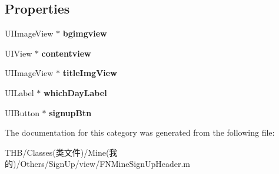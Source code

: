 \subsection*{Properties}
\begin{DoxyCompactItemize}
\item 
\mbox{\label{category_f_n_mine_sign_up_header_07_08_ac47719f30dbc6fb092c7ae9d204ffabe}} 
U\+I\+Image\+View $\ast$ {\bfseries bgimgview}
\item 
\mbox{\label{category_f_n_mine_sign_up_header_07_08_a6b0fad72723ae5265f229325bd9dd0ea}} 
U\+I\+View $\ast$ {\bfseries contentview}
\item 
\mbox{\label{category_f_n_mine_sign_up_header_07_08_accc60b601829aa56311dc91d6e6b45e8}} 
U\+I\+Image\+View $\ast$ {\bfseries title\+Img\+View}
\item 
\mbox{\label{category_f_n_mine_sign_up_header_07_08_a09edafa121d35e312cb11b108561d463}} 
U\+I\+Label $\ast$ {\bfseries which\+Day\+Label}
\item 
\mbox{\label{category_f_n_mine_sign_up_header_07_08_a5af076fba3b32eb00a122f857671e3c2}} 
U\+I\+Button $\ast$ {\bfseries signup\+Btn}
\end{DoxyCompactItemize}


The documentation for this category was generated from the following file\+:\begin{DoxyCompactItemize}
\item 
T\+H\+B/\+Classes(类文件)/\+Mine(我的)/\+Others/\+Sign\+Up/view/F\+N\+Mine\+Sign\+Up\+Header.\+m\end{DoxyCompactItemize}
